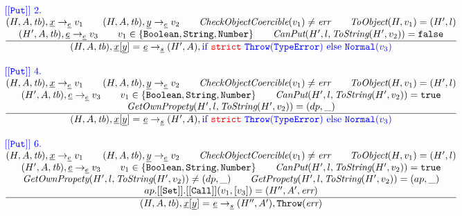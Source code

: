 \[\begin{array}{l@{~~}l@{~~}ll}
{\inblue {\tt[[Put]]}\ 2.}\\
\frac{\begin{matrix}
\evale, \irid \rightarrow_{\ir\expr} v_1
\rulesep
\evale, \ir{y} \rightarrow_{\ir\expr} v_2
\rulesep
\hf{CheckObjectCoercible}(v_1) \not= \err
\rulesep
\hf{ToObject}(H, v_1) = (H',l)
\\
(H', A, \tb), \irexpr \rightarrow_{\ir\expr} v_3
\rulesep
v_1 \in \{{\tt Boolean, String, Number}\}
\rulesep
\hf{CanPut}(H', l, \hf{ToString}(H', v_2)) = \false
\end{matrix}}{\begin{matrix}
\state, \irid{\tt[}\ir{y}{\tt] =} \ \irexpr \rightarrow_{\ir\stmt}
(H',A), \reject
\end{matrix}}
\\[2em]


{\inblue {\tt[[Put]]}\ 4.}\\
\frac{\begin{matrix}
\evale, \irid \rightarrow_{\ir\expr} v_1
\rulesep
\evale, \ir{y} \rightarrow_{\ir\expr} v_2
\rulesep
\hf{CheckObjectCoercible}(v_1) \not= \err
\rulesep
\hf{ToObject}(H, v_1) = (H',l)
\\
(H', A, \tb), \irexpr \rightarrow_{\ir\expr} v_3
\rulesep
v_1 \in \{{\tt Boolean, String, Number}\}
\rulesep
\hf{CanPut}(H', l, \hf{ToString}(H', v_2)) = \true
\\
\hf{GetOwnPropety}(H', l, \hf{ToString}(H', v_2)) = (dp, \_)
\end{matrix}}{\begin{matrix}
\state, \irid{\tt[}\ir{y}{\tt] =} \ \irexpr \rightarrow_{\ir\stmt}
(H',A), \reject
\end{matrix}}
\\[2em]



{\inblue {\tt[[Put]]}\ 6.}\\
\frac{\begin{matrix}
\evale, \irid \rightarrow_{\ir\expr} v_1
\rulesep
\evale, \ir{y} \rightarrow_{\ir\expr} v_2
\rulesep
\hf{CheckObjectCoercible}(v_1) \not= \err
\rulesep
\hf{ToObject}(H, v_1) = (H',l)
\\
(H', A, \tb), \irexpr \rightarrow_{\ir\expr} v_3
\rulesep
v_1 \in \{{\tt Boolean, String, Number}\}
\rulesep
\hf{CanPut}(H', l, \hf{ToString}(H', v_2)) = \true
\\
\hf{GetOwnPropety}(H', l, \hf{ToString}(H', v_2)) \not= (dp, \_)
\rulesep
\hf{GetPropety}(H', l, \hf{ToString}(H', v_2)) = (ap, \_)
\\
ap.{\tt[[Set]]}.{\tt[[Call]]}(v_1, [v_3]) = (H'', A', \err)
\end{matrix}}{\begin{matrix}
\state, \irid{\tt[}\ir{y}{\tt] =} \ \irexpr \rightarrow_{\ir\stmt}
(H'',A'), {\tt Throw}(\err)
\end{matrix}}
\\[2em]



\end{array}\]
